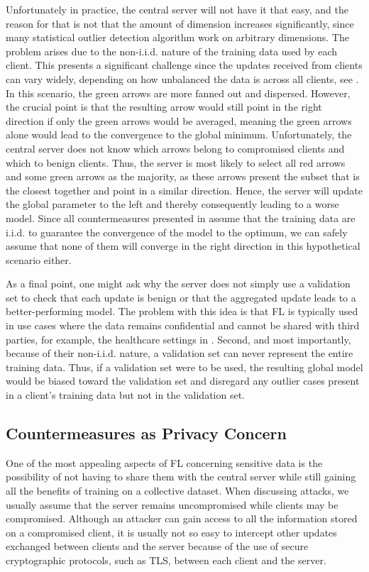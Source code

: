 \documentclass[conference]{IEEEtran}
\begin{document}
Unfortunately in practice, the central server will not have it that easy, and the reason for that is not that the amount of dimension increases significantly, since many statistical outlier detection algorithm work on arbitrary dimensions. The problem arises due to the non-i.i.d. nature of the training data used by each client. This presents a significant challenge since the updates received from clients can vary widely, depending on how unbalanced the data is across all clients, see . In this scenario, the green arrows are more fanned out and dispersed. However, the crucial point is that the resulting arrow would still point in the right direction if only the green arrows would be averaged, meaning the green arrows alone would lead to the convergence to the global minimum. Unfortunately, the central server does not know which arrows belong to compromised clients and which to benign clients. Thus, the server is most likely to select all red arrows and some green arrows as the majority, as these arrows present the subset that is the closest together and point in a similar direction. Hence, the server will update the global parameter to the left and thereby consequently leading to a worse model. Since all countermeasures presented in  assume that the training data are i.i.d. to guarantee the convergence of the model to the optimum, we can safely assume that none of them will converge in the right direction in this hypothetical scenario either.

As a final point, one might ask why the server does not simply use a validation set to check that each update is benign or that the aggregated update leads to a better-performing model. The problem with this idea is that FL is typically used in use cases where the data remains confidential and cannot be shared with third parties, for example, the healthcare settings in \cite{Jochems2016,Dayan2021}. Second, and most importantly, because of their non-i.i.d. nature, a validation set can never represent the entire training data. Thus, if a validation set were to be used, the resulting global model would be biased toward the validation set and disregard any outlier cases present in a client's training data but not in the validation set.


\subsection{Countermeasures as Privacy Concern}
One of the most appealing aspects of FL concerning sensitive data is the possibility of not having to share them with the central server while still gaining all the benefits of training on a collective dataset. When discussing attacks, we usually assume that the server remains uncompromised while clients may be compromised. Although an attacker can gain access to all the information stored on a compromised client, it is usually not so easy to intercept other updates exchanged between clients and the server because of the use of secure cryptographic protocols, such as TLS, between each client and the server.
\end{document}
